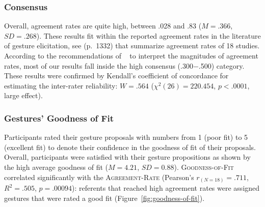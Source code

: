\subsubsection{Consensus}
Overall, agreement rates are quite high, between .028 and .83 ($M{=}.366$, $SD{=}.268$). These results fit within the reported agreement rates in the literature of gesture elicitation, see \cite{Vatavu:2015} (\mbox{p. 1332}) that summarize agreement rates of 18 studies. According to the recommendations of ~\cite{Vatavu:2015} to interpret the magnitudes of agreement rates, most of our results fall inside the high consensus (.300$-$.500) category. These results were confirmed by Kendall's coefficient of concordance for estimating the inter-rater reliability:
$W{=}.564$ ($\chi^2(26){=}220.454$, $p{<}.0001$, large effect).

\subsubsection{Gestures' Goodness of Fit}
Participants rated their gesture proposals with numbers from 1 (poor fit) to 5 (excellent fit) to denote their confidence in the goodness of fit of their proposals. Overall, participants were satisfied with their gesture propositions as shown by the high average goodness of fit ($M{=}4.21$, $SD{=}0.88$).
\textsc{Goodness-of-Fit} correlated significantly with the \textsc{Agreement-Rate} (Pearson's $r_{(N{=}18)}{=}.711$, $R^2{=}.505$, $p{=}.00094$): referents that reached high agreement rates were assigned gestures that were rated a good fit (Figure~\ref{fig:goodness-of-fit}).

